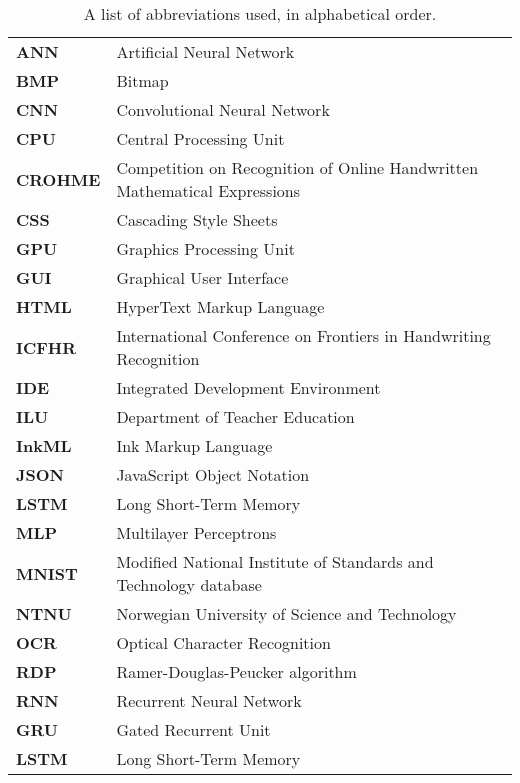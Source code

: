 \begin{table}[H]
\begin{tabular}{ l l }
\textbf{ANN} & Artificial Neural Network \\
\textbf{BMP} & Bitmap \\
\textbf{CNN} & Convolutional Neural Network \\
\textbf{CPU} & Central Processing Unit \\
\textbf{CROHME} & Competition on Recognition of Online Handwritten Mathematical Expressions\\
\textbf{CSS} & Cascading Style Sheets \\
\textbf{GPU} & Graphics Processing Unit \\
\textbf{GUI} & Graphical User Interface \\
\textbf{HTML} & HyperText Markup Language \\ 
\textbf{ICFHR} & International Conference on Frontiers in Handwriting Recognition \\
\textbf{IDE} & Integrated Development Environment \\
\textbf{ILU} & Department of Teacher Education \\
\textbf{InkML} & Ink Markup Language \\
\textbf{JSON} & JavaScript Object Notation \\
\textbf{LSTM} & Long Short-Term Memory \\
\textbf{MLP} & Multilayer Perceptrons \\
\textbf{MNIST} & Modified National Institute of Standards and Technology database \\
\textbf{NTNU} & Norwegian University of Science and Technology \\
\textbf{OCR} & Optical Character Recognition \\
\textbf{RDP} & Ramer-Douglas-Peucker algorithm \\
\textbf{RNN} & Recurrent Neural Network \\
\textbf{GRU} & Gated Recurrent Unit \\
\textbf{LSTM} & Long Short-Term Memory \\

\end{tabular}
\label{table:abbreviations}
\caption{A list of abbreviations used, in alphabetical order.}
\end{table}